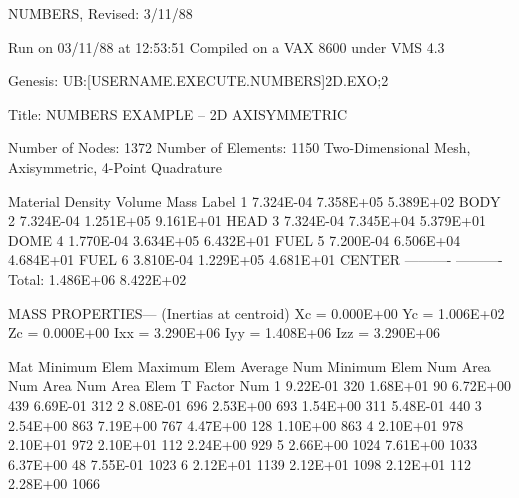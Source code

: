      NUMBERS, Revised:  3/11/88

     Run on 03/11/88 at 12:53:51
     Compiled on a VAX 8600 under VMS 4.3

     Genesis: UB:[USERNAME.EXECUTE.NUMBERS]2D.EXO;2

     Title:   NUMBERS EXAMPLE -- 2D AXISYMMETRIC

     Number of Nodes:      1372
     Number of Elements:   1150
     Two-Dimensional Mesh, Axisymmetric, 4-Point Quadrature

     Material    Density        Volume          Mass        Label
         1      7.324E-04      7.358E+05      5.389E+02     BODY            
         2      7.324E-04      1.251E+05      9.161E+01     HEAD            
         3      7.324E-04      7.345E+04      5.379E+01     DOME            
         4      1.770E-04      3.634E+05      6.432E+01     FUEL            
         5      7.200E-04      6.506E+04      4.684E+01     FUEL            
         6      3.810E-04      1.229E+05      4.681E+01     CENTER          
                              ----------     ----------
                  Total:       1.486E+06      8.422E+02

     MASS PROPERTIES--- (Inertias at centroid)
      Xc =  0.000E+00   Yc =  1.006E+02   Zc =  0.000E+00
     Ixx =  3.290E+06  Iyy =  1.408E+06  Izz =  3.290E+06


     Mat  Minimum   Elem   Maximum   Elem   Average   Num    Minimum   Elem
     Num    Area    Num      Area    Num      Area    Elem   T Factor  Num
      1   9.22E-01   320   1.68E+01    90   6.72E+00   439   6.69E-01   312
      2   8.08E-01   696   2.53E+00   693   1.54E+00   311   5.48E-01   440
      3   2.54E+00   863   7.19E+00   767   4.47E+00   128   1.10E+00   863
      4   2.10E+01   978   2.10E+01   972   2.10E+01   112   2.24E+00   929
      5   2.66E+00  1024   7.61E+00  1033   6.37E+00    48   7.55E-01  1023
      6   2.12E+01  1139   2.12E+01  1098   2.12E+01   112   2.28E+00  1066
